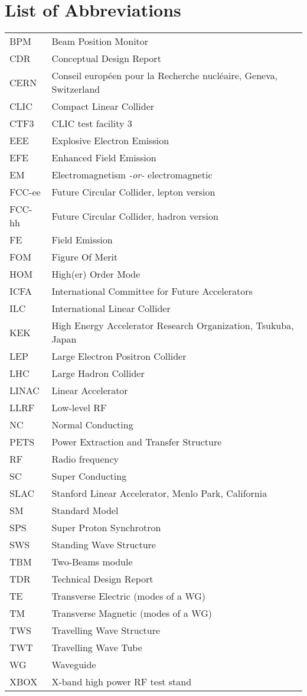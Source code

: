 \chapter*{List of Abbreviations}

\begin{tabular}{l l}
BPM		&	Beam Position Monitor\\
CDR		&	Conceptual Design Report\\
CERN	&	Conseil europ\'een pour la Recherche nucl\'eaire, Geneva, Switzerland\\
CLIC		&	Compact Linear Collider\\
CTF3	&	CLIC test facility 3\\
EEE		&	Explosive Electron Emission\\
EFE		&	Enhanced Field Emission\\
EM		&	Electromagnetism \textit{-or-} electromagnetic\\
FCC-ee	&	Future Circular Collider, lepton version\\
FCC-hh	&	Future Circular Collider, hadron version\\
FE		&	Field Emission\\
FOM		&	Figure Of Merit\\
HOM		&	High(er) Order Mode\\
ICFA		&	International Committee for Future Accelerators\\
ILC		&	International Linear Collider\\
KEK		&	High Energy Accelerator Research Organization, Tsukuba, Japan      \\  
LEP		&	Large Electron Positron Collider\\
LHC		&	Large Hadron Collider \\
LINAC	&	Linear Accelerator\\
LLRF	&	Low-level RF\\
NC		&	Normal Conducting\\
PETS	&	Power Extraction and Transfer Structure\\
RF		&	Radio frequency\\
SC		&	Super Conducting\\
SLAC	&	Stanford Linear Accelerator, Menlo Park, California\\
SM		&	Standard Model\\
SPS		&	Super Proton Synchrotron\\
SWS		&	Standing Wave Structure\\
TBM		&	Two-Beams module\\
TDR		&	Technical Design Report\\
TE		&	Transverse Electric (modes of a WG)\\
TM		&	Transverse Magnetic (modes of a WG)\\
TWS		&	Travelling Wave Structure\\
TWT		&	Travelling Wave Tube\\
WG		&	Waveguide\\
XBOX	&	X-band high power RF test stand\\
\end{tabular}